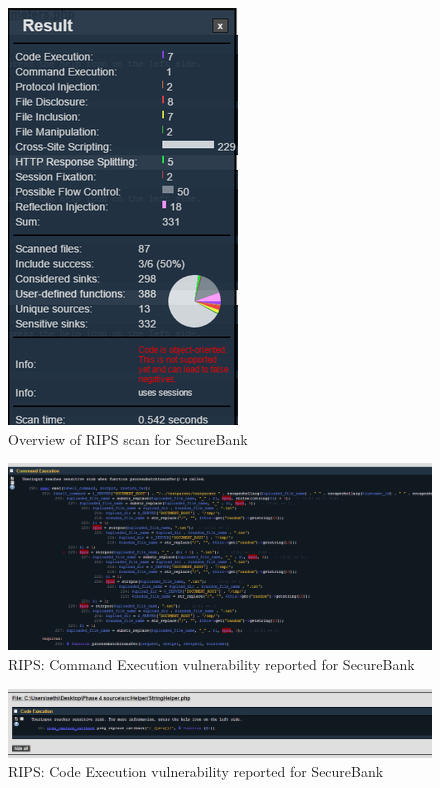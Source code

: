\begin{figure}[ht]
	\centering
	\includegraphics[width=.6\linewidth]{figures/rips_overview_secure_bank.png}
	\caption{Overview of RIPS scan for SecureBank}
	\label{fig:rips_overview_secure_bank}
\end{figure}

\begin{figure}[ht]
	\centering
	\includegraphics[width=.8\linewidth]{figures/rips_command_execution_secure_bank.png}
	\caption{RIPS: Command Execution vulnerability reported for SecureBank}
	\label{fig:rips_command_execution_secure_bank}
\end{figure}

\begin{figure}[ht]
	\centering
	\includegraphics[width=.8\linewidth]{figures/rips_code_execution_secure_bank.png}
	\caption{RIPS: Code Execution vulnerability reported for SecureBank}
	\label{fig:rips_code_execution_secure_bank}
\end{figure}

